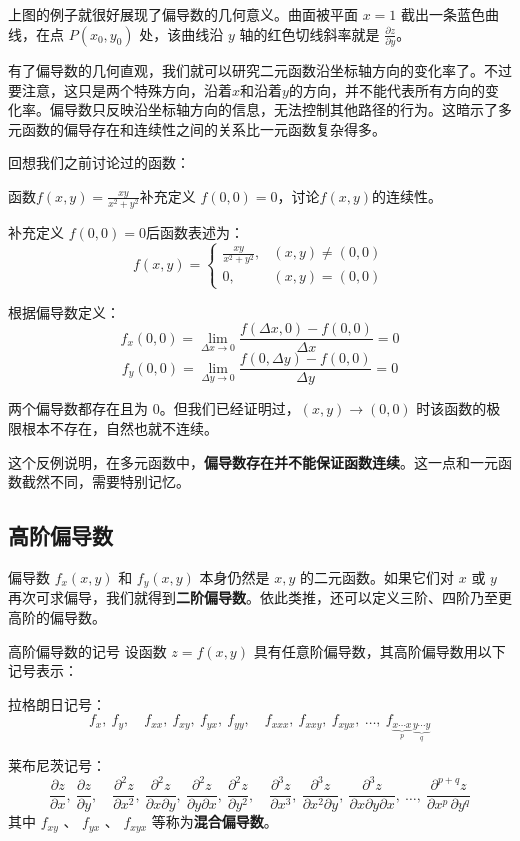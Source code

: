 上图的例子就很好展现了偏导数的几何意义。曲面被平面 $x = 1$ 截出一条蓝色曲线，在点 $P(x_0,y_0)$ 处，该曲线沿 $y$ 轴的红色切线斜率就是 $\frac{\partial z}{\partial y}$。

有了偏导数的几何直观，我们就可以研究二元函数沿坐标轴方向的变化率了。不过要注意，这只是两个特殊方向，沿着$x$和沿着$y$的方向，并不能代表所有方向的变化率。偏导数只反映沿坐标轴方向的信息，无法控制其他路径的行为。这暗示了多元函数的偏导存在和连续性之间的关系比一元函数复杂得多。

回想我们之前讨论过的函数：

\begin{myexample}
  函数\(f(x,y) = \frac{xy}{x^2 + y^2}\)补充定义 $f(0,0)=0$，讨论$f(x,y)$的连续性。

补充定义 $f(0,0)=0$后函数表述为：
\[
f(x,y) = \begin{cases}
\frac{xy}{x^2 + y^2}, & (x,y) \neq (0,0) \\
0, & (x,y) = (0,0)
\end{cases}
\]

根据偏导数定义：
\[
f_x(0,0) = \lim_{\Delta x\to0}\frac{f(\Delta x,0)-f(0,0)}{\Delta x} = 0
\]
\[
f_y(0,0) = \lim_{\Delta y\to0}\frac{f(0,\Delta y)-f(0,0)}{\Delta y} = 0
\]

两个偏导数都存在且为 $0$。但我们已经证明过，$(x,y)\to(0,0)$ 时该函数的极限根本不存在，自然也就不连续。
\end{myexample}

这个反例说明，在多元函数中，\textbf{偏导数存在并不能保证函数连续}。这一点和一元函数截然不同，需要特别记忆。

\subsection{高阶偏导数}

偏导数 $f_x(x,y)$ 和 $f_y(x,y)$ 本身仍然是 $x,y$ 的二元函数。如果它们对 $x$ 或 $y$ 再次可求偏导，我们就得到\textbf{二阶偏导数}。依此类推，还可以定义三阶、四阶乃至更高阶的偏导数。

\begin{definition}{高阶偏导数的记号}{}
设函数 $z = f(x, y)$ 具有任意阶偏导数，其高阶偏导数用以下记号表示：

拉格朗日记号：
\[
f_x,\ f_y,\quad 
f_{xx},\ f_{xy},\ f_{yx},\ f_{yy},\quad 
f_{xxx},\ f_{xxy},\ f_{xyx},\ \dots,\ 
f_{\underbrace{x\cdots x}_{p}\,\underbrace{y\cdots y}_{q}}
\]

莱布尼茨记号：
\[
\frac{\partial z}{\partial x},\ \frac{\partial z}{\partial y},\quad 
\frac{\partial^2 z}{\partial x^2},\ \frac{\partial^2 z}{\partial x\partial y},\ \frac{\partial^2 z}{\partial y\partial x},\ \frac{\partial^2 z}{\partial y^2},\quad \frac{\partial^3 z}{\partial x^3},\ \frac{\partial^3 z}{\partial x^2\partial y},\ \frac{\partial^3 z}{\partial x\partial y\partial x},\ \dots,\ \frac{\partial^{p+q} z}{\partial x^p\,\partial y^q}
\]
其中 $f_{xy}$ 、 $f_{yx}$ 、 $f_{xyx}$ 等称为\textbf{混合偏导数}。
\end{definition}

